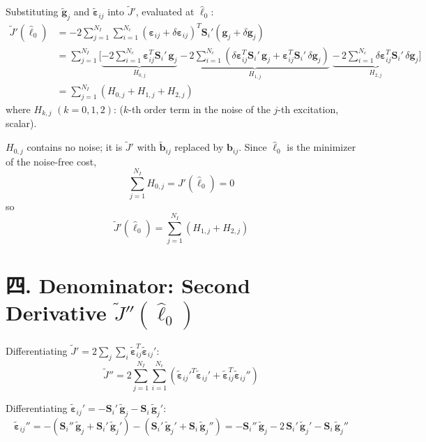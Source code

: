 \documentclass[11pt]{article}
\newcommand{\lh}{\hat{\ell}}
\begin{document}
Substituting $\tilde{\mathbf{g}}_j$ and $\tilde{\boldsymbol{\varepsilon}}_{ij}$ into $\tilde{J}'$, evaluated at $\lh_0$:
\[
\begin{aligned}
\tilde{J}'(\lh_0)&=-2\sum_{j=1}^{N_I}\sum_{i=1}^{N_c}\left(\boldsymbol{\varepsilon}_{ij}+\delta\boldsymbol{\varepsilon}_{ij}\right)^{T}\mathbf{S}_i'\left(\mathbf{g}_j+\delta\mathbf{g}_j\right)\\
&=\sum_{j=1}^{N_I}\Bigg[\underbrace{-2\sum_{i=1}^{N_c}\boldsymbol{\varepsilon}_{ij}^{T}\mathbf{S}_i'\,\mathbf{g}_j}_{H_{0,j}}
\;\underbrace{-\,2\sum_{i=1}^{N_c}\left(\delta\boldsymbol{\varepsilon}_{ij}^{T}\mathbf{S}_i'\,\mathbf{g}_j+\boldsymbol{\varepsilon}_{ij}^{T}\mathbf{S}_i'\,\delta\mathbf{g}_j\right)}_{H_{1,j}}
\;\underbrace{-\,2\sum_{i=1}^{N_c}\delta\boldsymbol{\varepsilon}_{ij}^{T}\mathbf{S}_i'\,\delta\mathbf{g}_j}_{H_{2,j}}\Bigg]\\
&=\sum_{j=1}^{N_I}\left(H_{0,j}+H_{1,j}+H_{2,j}\right)
\end{aligned}
\]
where $H_{k,j}$ $(k=0,1,2)$: ($k$-th order term in the noise of the $j$-th excitation, scalar).

$H_{0,j}$ contains no noise; it is $\tilde{J}'$ with $\tilde{\mathbf{b}}_{ij}$ replaced by $\mathbf{b}_{ij}$.
Since $\lh_0$ is the minimizer of the noise-free cost,
\[
\sum_{j=1}^{N_I}H_{0,j}=J'(\lh_0)=0
\]
so
\[
\tilde{J}'(\lh_0)=\sum_{j=1}^{N_I}\left(H_{1,j}+H_{2,j}\right)
\]

\section*{{\cjk 四.} Denominator: Second Derivative $\tilde{J}''(\hat{\ell}_0)$}

Differentiating $\tilde{J}'=2\sum_{j}\sum_{i}\tilde{\boldsymbol{\varepsilon}}_{ij}^{T}\tilde{\boldsymbol{\varepsilon}}_{ij}'$:
\[
\tilde{J}''=2\sum_{j=1}^{N_I}\sum_{i=1}^{N_c}\left(\tilde{\boldsymbol{\varepsilon}}_{ij}'^{T}\tilde{\boldsymbol{\varepsilon}}_{ij}'+\tilde{\boldsymbol{\varepsilon}}_{ij}^{T}\tilde{\boldsymbol{\varepsilon}}_{ij}''\right)
\]

Differentiating $\tilde{\boldsymbol{\varepsilon}}_{ij}'=-\mathbf{S}_i'\,\tilde{\mathbf{g}}_j-\mathbf{S}_i\,\tilde{\mathbf{g}}_j'$:
\[
\tilde{\boldsymbol{\varepsilon}}_{ij}''
=-\left(\mathbf{S}_i''\,\tilde{\mathbf{g}}_j+\mathbf{S}_i'\,\tilde{\mathbf{g}}_j'\right)-\left(\mathbf{S}_i'\,\tilde{\mathbf{g}}_j'+\mathbf{S}_i\,\tilde{\mathbf{g}}_j''\right)
=-\mathbf{S}_i''\,\tilde{\mathbf{g}}_j-2\,\mathbf{S}_i'\,\tilde{\mathbf{g}}_j'-\mathbf{S}_i\,\tilde{\mathbf{g}}_j''
\]
\end{document}
